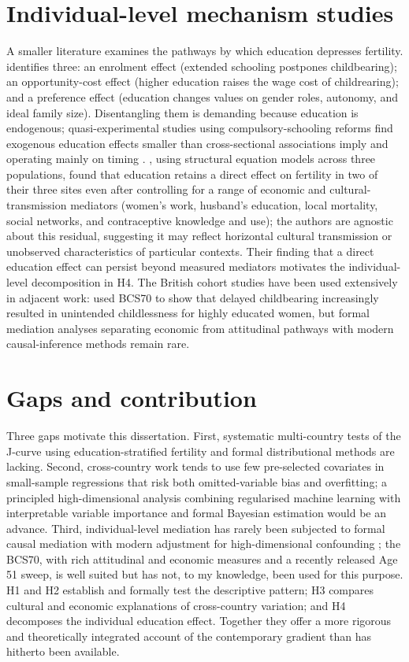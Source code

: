 \documentclass[12pt,a4paper]{report}
\begin{document}
\section{Individual-level mechanism studies}
A smaller literature examines the pathways by which education depresses fertility.
\citet{skirbekk2008} identifies three: an enrolment effect (extended schooling postpones
childbearing); an opportunity-cost effect (higher education raises the wage cost of childrearing);
and a preference effect (education changes values on gender roles, autonomy, and ideal family
size). Disentangling them is demanding because education is endogenous; quasi-experimental studies
using compulsory-schooling reforms find exogenous education effects smaller than cross-sectional
associations imply and operating mainly on timing \citep{monstad2008,cyganrehm2013}.
\citet{snopkowski2016}, using structural equation models across three populations, found that
education retains a direct effect on fertility in two of their three sites even after controlling for
a range of economic and cultural-transmission mediators (women's work, husband's education, local
mortality, social networks, and contraceptive knowledge and use); the authors are agnostic about this
residual, suggesting it may reflect horizontal cultural transmission or unobserved characteristics of
particular contexts. Their finding that a direct education effect can persist beyond measured
mediators motivates the individual-level decomposition in H4. The British cohort studies have been used
extensively in adjacent work: \citet{berrington2017} used BCS70 to show that delayed childbearing
increasingly resulted in unintended childlessness for highly educated women, but formal mediation
analyses separating economic from attitudinal pathways with modern causal-inference methods remain
rare.

\section{Gaps and contribution}
Three gaps motivate this dissertation. First, systematic multi-country tests of the J-curve using
education-stratified fertility and formal distributional methods are lacking. Second, cross-country
work tends to use few pre-selected covariates in small-sample regressions that risk both
omitted-variable bias and overfitting; a principled high-dimensional analysis combining regularised
machine learning with interpretable variable importance \citep{atheywager2019,lundberglee2017} and
formal Bayesian estimation would be an advance. Third, individual-level mediation has rarely been
subjected to formal causal mediation with modern adjustment for high-dimensional confounding
\citep{chernozhukov2018}; the BCS70, with rich attitudinal and economic measures and a recently
released Age 51 sweep, is well suited but has not, to my knowledge, been used for this purpose. H1
and H2 establish and formally test the descriptive pattern; H3 compares cultural and economic
explanations of cross-country variation; and H4 decomposes the individual education effect. Together
they offer a more rigorous and theoretically integrated account of the contemporary gradient than
has hitherto been available.
\end{document}
